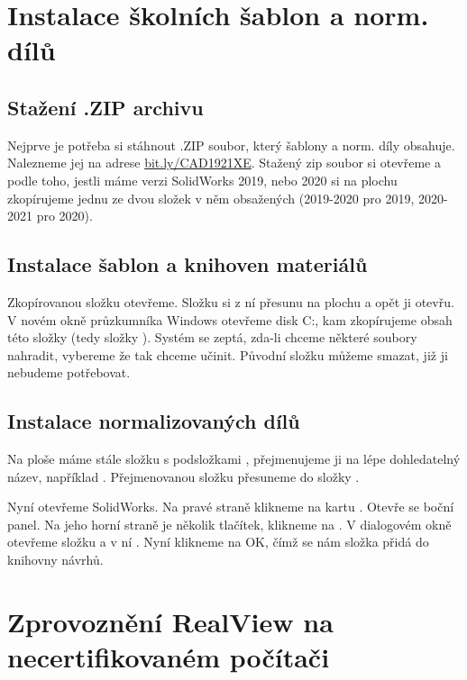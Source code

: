 \section{Instalace školních šablon a norm. dílů}

\subsection*{Stažení .ZIP archivu}
Nejprve je potřeba si stáhnout .ZIP soubor, který šablony a norm. díly obsahuje.
Nalezneme jej na adrese \href{https://bit.ly/CAD1921XE}{bit.ly/CAD1921XE}.
Stažený zip soubor si otevřeme a podle toho, jestli máme verzi SolidWorks 2019, nebo 2020 si na plochu zkopírujeme jednu ze dvou složek v něm obsažených (2019-2020 pro 2019, 2020-2021 pro 2020).

\subsection*{Instalace šablon a knihoven materiálů}
Zkopírovanou složku otevřeme.
Složku  si z ní přesunu na plochu a opět ji otevřu.
V novém okně průzkumníka Windows otevřeme disk C:, kam zkopírujeme obsah této složky (tedy složky ).
Systém se zeptá, zda-li chceme některé soubory nahradit, vybereme že tak chceme učinit.
Původní složku  můžeme smazat, již ji nebudeme potřebovat.

\subsection*{Instalace normalizovaných dílů}
Na ploše máme stále složku s podsložkami , přejmenujeme ji na lépe dohledatelný název, například .
Přejmenovanou složku přesuneme do složky .

\noindent Nyní otevřeme SolidWorks.
Na pravé straně klikneme na kartu .
Otevře se boční panel.
Na jeho horní straně je několik tlačítek, klikneme na .
V dialogovém okně otevřeme složku  a v ní .
Nyní klikneme na OK, čímž se nám složka přidá do knihovny návrhů.

\section{Zprovoznění RealView na necertifikovaném počítači}
